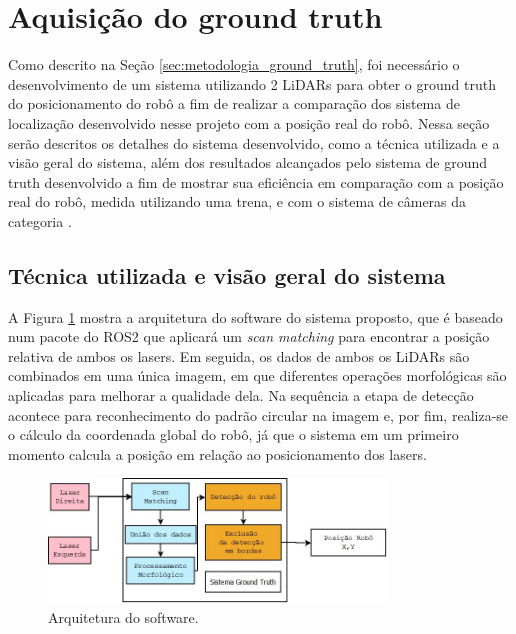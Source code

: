 \documentclass[acronym, symbols, table]{fei}
\begin{document}
		\section{Aquisição do ground truth} \label{sec:resultados_ground_truth}
		
			Como descrito na Seção \ref{sec:metodologia_ground_truth}, foi necessário o desenvolvimento de um sistema utilizando 2 LiDARs para obter o ground truth do posicionamento do robô a fim de realizar a comparação dos sistema de localização desenvolvido nesse projeto com a posição real do robô. Nessa seção serão descritos os detalhes do sistema desenvolvido, como a técnica utilizada e a visão geral do sistema, além dos resultados alcançados pelo sistema de ground truth desenvolvido a fim de mostrar sua eficiência em comparação com a posição real do robô, medida utilizando uma trena, e com o sistema de câmeras da categoria .
		
			\subsection{Técnica utilizada e visão geral do sistema}
				
				A Figura \ref{fig:software_architecture} mostra a arquitetura do software do sistema proposto, que é baseado num pacote do ROS2 que aplicará um \textit{scan matching} para encontrar a posição relativa de ambos os lasers. Em seguida, os dados de ambos os LiDARs são combinados em uma única imagem, em que diferentes operações morfológicas são aplicadas para melhorar a qualidade dela. Na sequência a etapa de detecção acontece para reconhecimento do padrão circular na imagem e, por fim, realiza-se o cálculo da coordenada global do robô, já que o sistema em um primeiro momento calcula a posição em relação ao posicionamento dos lasers.
					
				\begin{figure}[!htb]
					\centering
					\includegraphics[width=0.80\textwidth]{software_architecture.jpeg}
					\caption{Arquitetura do software.} \label{fig:software_architecture}
				\end{figure}
			
\end{document}
